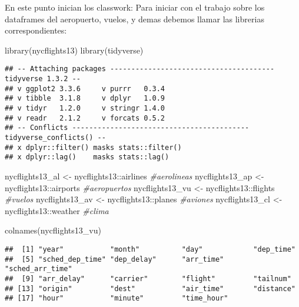 \documentclass[
]{article}
\newenvironment{Shaded}{\begin{snugshade}}{\end{snugshade}}
\newcommand{\CommentTok}[1]{\textcolor[rgb]{0.56,0.35,0.01}{\textit{#1}}}
\newcommand{\FunctionTok}[1]{\textcolor[rgb]{0.00,0.00,0.00}{#1}}
\newcommand{\NormalTok}[1]{#1}
\newcommand{\OtherTok}[1]{\textcolor[rgb]{0.56,0.35,0.01}{#1}}
\newcommand{\SpecialCharTok}[1]{\textcolor[rgb]{0.00,0.00,0.00}{#1}}
\begin{document}
En este punto inician los classwork: Para iniciar con el trabajo sobre
los dataframes del aeropuerto, vuelos, y demas debemos llamar las
librerias correspondientes:

\begin{Shaded}
\begin{Highlighting}[]
\FunctionTok{library}\NormalTok{(nycflights13)}
\FunctionTok{library}\NormalTok{(tidyverse)}
\end{Highlighting}
\end{Shaded}

\begin{verbatim}
## -- Attaching packages --------------------------------------- tidyverse 1.3.2 --
## v ggplot2 3.3.6     v purrr   0.3.4
## v tibble  3.1.8     v dplyr   1.0.9
## v tidyr   1.2.0     v stringr 1.4.0
## v readr   2.1.2     v forcats 0.5.2
## -- Conflicts ------------------------------------------ tidyverse_conflicts() --
## x dplyr::filter() masks stats::filter()
## x dplyr::lag()    masks stats::lag()
\end{verbatim}

\begin{Shaded}
\begin{Highlighting}[]
\NormalTok{nycflights13\_al }\OtherTok{\textless{}{-}}\NormalTok{ nycflights13}\SpecialCharTok{::}\NormalTok{airlines }\CommentTok{\#aerolineas}
\NormalTok{nycflights13\_ap }\OtherTok{\textless{}{-}}\NormalTok{ nycflights13}\SpecialCharTok{::}\NormalTok{airports }\CommentTok{\#aeropuertos}
\NormalTok{nycflights13\_vu }\OtherTok{\textless{}{-}}\NormalTok{ nycflights13}\SpecialCharTok{::}\NormalTok{flights }\CommentTok{\#vuelos}
\NormalTok{nycflights13\_av }\OtherTok{\textless{}{-}}\NormalTok{ nycflights13}\SpecialCharTok{::}\NormalTok{planes }\CommentTok{\#aviones}
\NormalTok{nycflights13\_cl }\OtherTok{\textless{}{-}}\NormalTok{ nycflights13}\SpecialCharTok{::}\NormalTok{weather }\CommentTok{\#clima}

\FunctionTok{colnames}\NormalTok{(nycflights13\_vu)}
\end{Highlighting}
\end{Shaded}

\begin{verbatim}
##  [1] "year"           "month"          "day"            "dep_time"      
##  [5] "sched_dep_time" "dep_delay"      "arr_time"       "sched_arr_time"
##  [9] "arr_delay"      "carrier"        "flight"         "tailnum"       
## [13] "origin"         "dest"           "air_time"       "distance"      
## [17] "hour"           "minute"         "time_hour"
\end{verbatim}
\end{document}
